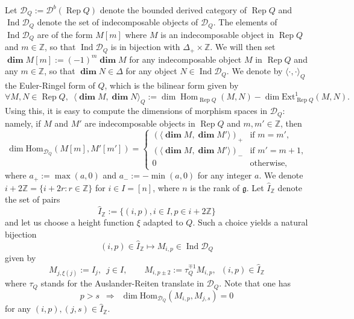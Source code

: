 \documentclass[12pt]{amsart}
\theoremstyle{plain}
\theoremstyle{definition}
\numberwithin{equation}{section}
\newcommand{\ZZ}{{\mathbb {Z}}}
\DeclareMathOperator{\Hom}{Hom}
\newcommand{\IZ}{\widehat{I}_{\mathbb{Z}}}
\newcommand{\DQ}{\mathcal{D}_Q}
\DeclareMathOperator*{\rep}{Rep}
\DeclareMathOperator*{\ind}{Ind}
\DeclareMathOperator*{\dimvec}{\mathbf{dim}}
\begin{document}
    Let $\DQ := \mathcal{D}^b(\rep Q)$ denote the bounded derived category of $\rep Q$ and $\ind \DQ$ denote the set of indecomposable objects of $\DQ$. The elements of $\ind \DQ$ are of the form $M[m]$ where $M$ is an indecomposable object in $\rep Q$ and $m \in \mathbb{Z}$, so that $\ind \DQ$ is in bijection with $\Delta_+ \times \mathbb{Z}$. We will then set $ \dimvec M[m] := (-1)^m \dimvec M$ for any indecomposable object $M$ in $\rep Q$ and any $m \in \mathbb{Z}$, so that $\dimvec N \in \Delta$ for any object $N \in \ind \DQ$.  
    We denote by $\langle \cdot  , \cdot  \rangle_Q$ the Euler-Ringel form of $Q$, which is the bilinear form given by 
    $$  \forall M,N \in \rep Q, \enspace \langle \dimvec M , \dimvec N \rangle_Q := \dim \Hom_{\rep Q}(M,N) - \dim \mathrm{Ext}^1_{\rep Q}(M,N) . $$
    Using this, it is easy to compute the dimensions of morphism spaces in $\DQ$: namely, if $M$ and $M'$ are indecomposable objects in $\rep Q$ and $m,m' \in \mathbb{Z}$, then 
     \begin{equation} \label{eq : dim of Homs in DbRepQ}
    \dim \mathrm{Hom}_{\DQ}(M[m],M'[m']) =
    \begin{cases}
        (\langle \boldsymbol{\dim}M, \boldsymbol{\dim}M' \rangle )_+& \text{if $m=m'$,} \\
        (\langle \boldsymbol{\dim}M, \boldsymbol{\dim}M' \rangle)_- & \text{if $m' = m+1$,} \\
        0 & \text{otherwise,}
    \end{cases}
    \end{equation}
where $a_+ := \max(a,0)$ and $a_- := - \min(a,0)$ for any integer $a$. 
We denote $i+2\ZZ = \{i+2r: r \in \ZZ\}$ for $i \in I = [n]$, where $n$ is the rank of $\mathfrak{g}$. Let $\IZ$ denote the set of pairs
$$ \IZ := \{ (i,p) , i \in I , p \in i + 2 \mathbb{Z} \}  $$
and let us choose a height function $\xi$ adapted to $Q$. 
Such a choice yields a natural bijection 
\begin{equation} \label{eq : bijection}
(i,p) \in \IZ \longmapsto M_{i,p} \in \ind \DQ 
\end{equation}
given by 
$$ M_{j, \xi(j)} :=  I_j, \enspace j \in I, \qquad M_{i,p \pm 2} := \tau_Q^{ \mp 1} M_{i,p} ,  \enspace (i,p) \in \IZ  $$
where $\tau_Q$ stands for the Auslander-Reiten translate in $\DQ$. Note that one has 
 \begin{equation} \label{eq : dim Hom = 0}
 p>s \enspace  \Rightarrow  \enspace  \dim \mathrm{Hom}_{\DQ}(M_{i,p},M_{j,s}) = 0  
 \end{equation}
for any $(i,p), (j,s) \in \IZ$.
\end{document}
